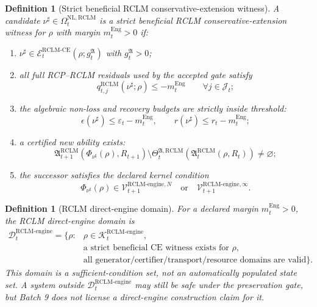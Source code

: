 \documentclass[11pt,a4paper]{article}
\newtheorem{definition}[theorem]{Definition}
\newcommand{\Kcal}{\mathcal K}
\newcommand{\Vcal}{\mathcal V}
\newcommand{\Dcal}{\mathcal D}
\newcommand{\eps}{\varepsilon}
\newcommand{\RCLM}{\mathrm{RCLM}}
\newcommand{\engine}{\mathrm{engine}}
\newcommand{\NL}{\mathrm{NL}}
\newcommand{\CE}{\mathrm{CE}}
\newcommand{\Eng}{\mathrm{Eng}}
\begin{document}
\begin{definition}[Strict beneficial RCLM conservative-extension witness]
\label{def:strict-beneficial-rclm-ce-witness}
A candidate \(\nu^\sharp\in\Omega_t^{\NL,\RCLM}\) is a strict beneficial RCLM conservative-extension witness for \(\rho\) with margin \(m_t^{\Eng}>0\) if:
\begin{enumerate}[label=(\alph*),leftmargin=1.5em]
    \item \(\nu^\sharp\in\mathcal E_t^{\RCLM\text{-}\CE}(\rho;g_t^{\mathfrak A})\) with \(g_t^{\mathfrak A}>0\);
    \item all full RCP--RCLM residuals used by the accepted gate satisfy
    \[
    q_{t,j}^{\RCLM}(\nu^\sharp;\rho)\le -m_t^{\Eng}\qquad\forall j\in\mathcal J_t;
    \]
    \item the algebraic non-loss and recovery budgets are strictly inside threshold:
    \[
    \epsilon(\nu^\sharp)\le \eps_t-m_t^{\Eng},
    \qquad
    r(\nu^\sharp)\le r_t-m_t^{\Eng};
    \]
    \item a certified new ability exists:
    \[
    \mathfrak A_{t+1}^{\RCLM}(\Phi_{\nu^\sharp}(\rho),R_{t+1})
    \setminus
    \Theta_t^{\mathfrak A,\RCLM}(\mathfrak A_t^{\RCLM}(\rho,R_t))
    \ne\varnothing;
    \]
    \item the successor satisfies the declared kernel condition
    \[
    \Phi_{\nu^\sharp}(\rho)\in
    \Vcal_{t+1}^{\RCLM\text{-}\engine,N}
    \quad\text{or}\quad
    \Vcal_{t+1}^{\RCLM\text{-}\engine,\infty}.
    \]
\end{enumerate}
\end{definition}

\begin{definition}[RCLM direct-engine domain]
\label{def:rclm-direct-engine-domain}
For a declared margin \(m_t^{\Eng}>0\), the RCLM direct-engine domain is
\[
\begin{aligned}
\Dcal_t^{\RCLM\text{-}\engine}
=
\{\rho:{}&\rho\in\Kcal_t^{\RCLM\text{-}\engine},\\
&\text{a strict beneficial CE witness exists for }\rho,\\
&\text{all generator/certifier/transport/resource domains are valid}\}.
\end{aligned}
\]
This domain is a sufficient-condition set, not an automatically populated state set. A system outside \(\Dcal_t^{\RCLM\text{-}\engine}\) may still be safe under the preservation gate, but Batch 9 does not license a direct-engine construction claim for it.
\end{definition}
\end{document}
